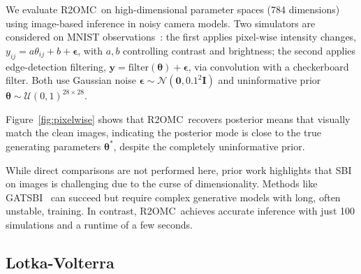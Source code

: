 \documentclass[twoside]{article}
\newcommand{\thb}{\boldsymbol{\theta}}
\newcommand{\yb}{\mathbf{y}}
\newcommand{\rromc}{R2OMC}
\begin{document}
\vspace{-1ex}
We evaluate \rromc~on high-dimensional parameter spaces (784 dimensions) using image-based inference in noisy camera models.
Two simulators are considered on MNIST observations~\citep{lecun1998gradient}:
the first applies pixel-wise intensity changes, $y_{ij} = a\theta_{ij} + b + \boldsymbol{\epsilon}$,
with $a, b$ controlling contrast and brightness;
the second applies edge-detection filtering, $\yb = \text{filter}(\thb) + \boldsymbol{\epsilon}$,
via convolution with a checkerboard filter.
Both use Gaussian noise $\boldsymbol{\epsilon} \sim \mathcal{N}(\mathbf{0}, 0.1^2 \mathbf{I})$ and
uninformative prior $\thb \sim \mathcal{U}(0,1)^{28 \times 28}$.

Figure~\ref{fig:pixelwise} shows that \rromc~recovers posterior means that visually match the clean images, indicating the posterior mode is close to the true generating parameters
$\thb^*$, despite the completely uninformative prior.

While direct comparisons are not performed here, prior work highlights that SBI on images is challenging due to the curse of dimensionality. 
Methods like GATSBI~\citep{ramesh2022gatsbi} can succeed but require complex generative models with long, often unstable, training. 
In contrast, \rromc~achieves accurate inference with just 100 simulations and a runtime of a few seconds.

\vspace{-1ex}
\subsection{Lotka-Volterra}
\label{subsec:lotka-volterra}
\end{document}
